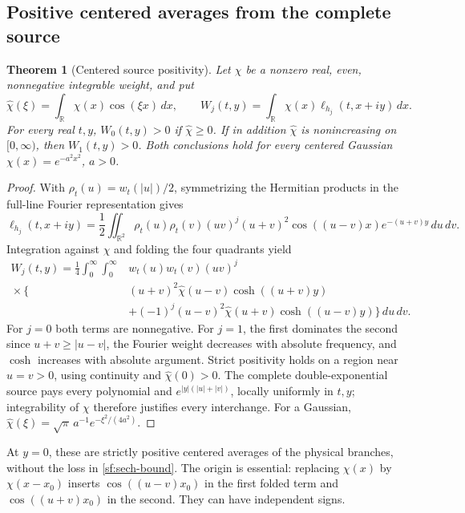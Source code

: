 \documentclass[11pt]{article}
\numberwithin{equation}{section}
\newtheorem{theorem}{Theorem}[section]
\theoremstyle{definition}
\theoremstyle{remark}
\newcommand{\R}{\mathbb R}
\newcommand{\dd}{\,d}
\begin{document}
\subsection{Positive centered averages from the complete source}

\begin{theorem}[Centered source positivity]
\label{sf:centered}
Let \(\chi\) be a nonzero real, even, nonnegative integrable weight,
and put
\[
 \widehat\chi(\xi)=\int_{\R}\chi(x)\cos(\xi x)\dd x,\qquad
 W_j(t,y)=\int_{\R}\chi(x)\ell_{h_j}(t,x+iy)\dd x .
\]
For every real \(t,y\), \(W_0(t,y)>0\) if
\(\widehat\chi\ge0\).  If in addition \(\widehat\chi\) is
nonincreasing on \([0,\infty)\), then \(W_1(t,y)>0\).
Both conclusions hold for every centered Gaussian
\(\chi(x)=e^{-a^2x^2}\), \(a>0\).
\end{theorem}
\begin{proof}
With \(\rho_t(u)=w_t(|u|)/2\), symmetrizing the Hermitian products
in the full-line Fourier representation gives
\[
 \ell_{h_j}(t,x+iy)=\frac12\iint_{\R^2}
 \rho_t(u)\rho_t(v)(uv)^j(u+v)^2
                 \cos((u-v)x)e^{-(u+v)y}\dd u\dd v .
\]
Integration against \(\chi\) and folding the four quadrants yield
\begin{equation}
 \begin{split}
 W_j(t,y)=\frac14\int_0^\infty\!\int_0^\infty
 &w_t(u)w_t(v)(uv)^j\\
 {}\times\bigl\{&
 (u+v)^2\widehat\chi(u-v)\cosh((u+v)y)\\
 &+(-1)^j(u-v)^2\widehat\chi(u+v)\cosh((u-v)y)
                      \bigr\}\dd u\dd v .
 \end{split}
 \label{sf:centered-fold}
\end{equation}
For \(j=0\) both terms are nonnegative.  For \(j=1\), the first
dominates the second since \(u+v\ge|u-v|\), the Fourier weight
decreases with absolute frequency, and \(\cosh\) increases with
absolute argument.  Strict positivity holds on a region near
\(u=v>0\), using continuity and \(\widehat\chi(0)>0\).
The complete double-exponential source pays every polynomial and
\(e^{|y|(|u|+|v|)}\), locally uniformly in \(t,y\); integrability
of \(\chi\) therefore justifies every interchange.  For a Gaussian,
\(\widehat\chi(\xi)=\sqrt\pi\,a^{-1}e^{-\xi^2/(4a^2)}\).
\end{proof}

At \(y=0\), these are strictly positive centered averages of the
physical branches, without the loss in \eqref{sf:sech-bound}.
The origin is essential: replacing \(\chi(x)\) by \(\chi(x-x_0)\)
inserts \(\cos((u-v)x_0)\) in the first folded term and
\(\cos((u+v)x_0)\) in the second.  They can have independent signs.
\end{document}
